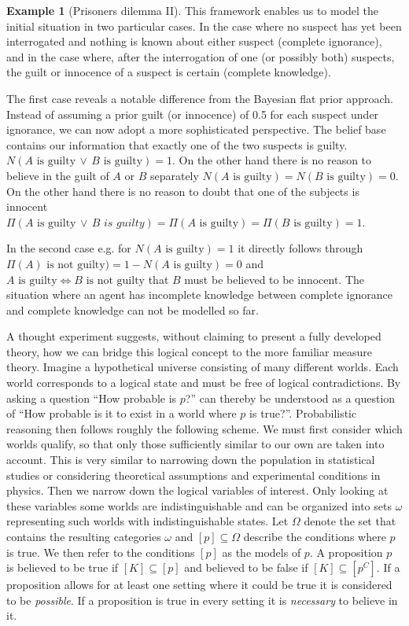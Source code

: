 \documentclass[
]{report}
\theoremstyle{definition}
\newtheorem{example}{Example}[section]
\begin{document}
\begin{example}[Prisoners dilemma II]
This framework enables us to model the initial situation in two particular cases. In the case where no suspect has yet been interrogated and nothing is known about either suspect (complete ignorance), and in the case where, after the interrogation of one (or possibly both) suspects, the guilt or innocence of a suspect is certain (complete knowledge).

The first case reveals a notable difference from the Bayesian flat prior approach. Instead of assuming a prior guilt (or innocence) of 0.5 for each suspect under ignorance, we can now adopt a more sophisticated perspective. The belief base contains our information that exactly one of the two suspects is guilty. $N(A \text{ is guilty} \, \lor \, B \text{ is guilty}) = 1$. On the other hand there is no reason to believe in the guilt of $A$ or $B$ separately $N(A \text{ is guilty}) = N(B \text{ is guilty}) = 0$. On the other hand there is no reason to doubt that one of the subjects is innocent $\Pi(A \text{ is guilty} \, \lor \, B \textit{ is guilty}) = \Pi (A \text{ is guilty}) = \Pi (B \text{ is guilty}) = 1$. 

In the second case e.g. for $N(A \text{ is guilty}) = 1$ it directly follows through $\Pi(A) \text{ is not guilty}) = 1 -  N(A \text{ is guilty}) = 0$ and $A \text{ is guilty} \Leftrightarrow B \text{ is not guilty}$ that $B$ must be believed to be innocent. The situation where an agent has incomplete knowledge between complete ignorance and complete knowledge can not be modelled so far.
\end{example}

A thought experiment suggests, without claiming to present a fully
developed theory, how we can bridge this logical concept to the more
familiar measure theory. Imagine a hypothetical universe consisting of
many different worlds. Each world corresponds to a logical state and
must be free of logical contradictions. By asking a question ``How
probable is \(p\)?'' can thereby be understood as a question of ``How
probable is it to exist in a world where \(p\) is true?''. Probabilistic
reasoning then follows roughly the following scheme. We must first
consider which worlds qualify, so that only those sufficiently similar
to our own are taken into account. This is very similar to narrowing
down the population in statistical studies or considering theoretical
assumptions and experimental conditions in physics. Then we narrow down
the logical variables of interest. Only looking at these variables some
worlds are indistinguishable and can be organized into sets \(\omega\)
representing such worlds with indistinguishable states. Let \(\Omega\)
denote the set that contains the resulting categories \(\omega\) and
\([p] \subseteq \Omega\) describe the conditions where \(p\) is true. We
then refer to the conditions \([p]\) as the models of \(p\). A
proposition \(p\) is believed to be true if \([K] \subseteq [p]\) and
believed to be false if \([K] \subseteq [p^C]\). If a proposition allows
for at least one setting where it could be true it is considered to be
\textit{possible}. If a proposition is true in every setting it is
\textit{necessary} to believe in it.
\end{document}
